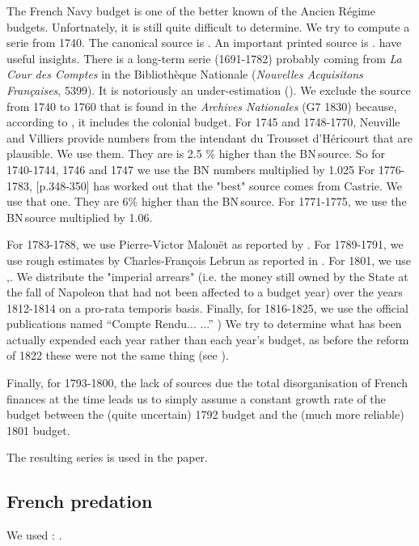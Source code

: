 \documentclass[12pt,a4paper,notitlepage,english]{article}
\begin{document}
\begin{appendix}
The French Navy budget is one of the better known of the Ancien Régime budgets. Unfortnately, it is still quite difficult to determine. We try to compute a serie from 1740.
The canonical source is \cite{Legoherel1965}.
An important printed source is \cite{Neuville1898}. \cite{Dull1975, Villiers1991} have useful insights.
There is a long-term serie (1691-1782) probably coming from \textit{La Cour des Comptes} in the Bibliothèque Nationale (\textit{Nouvelles Acquisitons Françaises}, 5399).
It is notoriously an under-estimation (\cite{Villiers1991}).
We exclude the source from 1740 to 1760 that is found in the \textit{Archives Nationales} (G7 1830) because, according to \cite{Villiers1991}, it includes the colonial budget.
For 1745 and 1748-1770, Neuville and Villiers provide numbers from the intendant du Trousset d’Héricourt that are plausible.
We use them.
They are is 2.5 \% higher than the BN source.
So for 1740-1744, 1746 and 1747 we use the BN numbers multiplied by 1.025
For 1776-1783, \cite{Dull1975}[p.348-350] has worked out that the "best" source comes from Castrie.
We use that one.
They are 6\% higher than the BN source.
For 1771-1775, we use the BN source multiplied by 1.06.

For 1783-1788, we use Pierre-Victor Malouët as reported by \cite{Villiers1991}. For 1789-1791, we use rough estimates by Charles-François Lebrun as reported in \cite[][ p. 259 and 332]{Marion1914}. For 1801, we use \cite{Branda2007},. We distribute the "imperial arrears" (i.e. the money still owned by the State at the fall of Napoleon that had not been affected to a budget year) over the years 1812-1814 on a pro-rata temporis basis.
Finally, for 1816-1825, we use the official publications named ``Compte Rendu... ...'' \citep{1814,1818,1826})
We try to determine what has been actually expended each year rather than each year’s budget, as before the reform of 1822 these were not the same thing (see \cite{Kott2019}).

Finally, for 1793-1800, the lack of sources due the total disorganisation of French finances at the time leads us to simply assume a constant growth rate of the budget between the (quite uncertain) 1792 budget and the (much more reliable) 1801 budget.

The resulting series is used in the paper.

\subsection{French predation} \label{french_predation}
We used : \cite{Villiers1991,Villiers2007,Marzagalli2013,Aumont2016,Aumont2016a,Crowhurst1989}.


\end{appendix}
\end{document}
